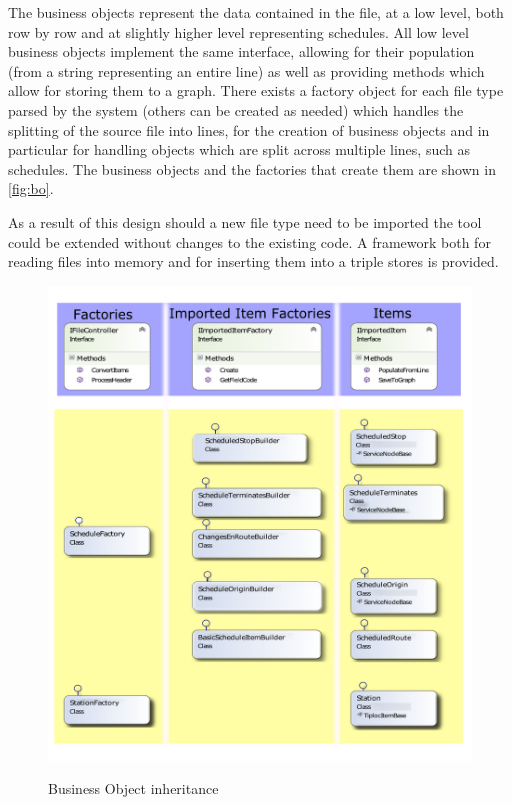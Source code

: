 The business objects represent the data contained in the file, at a low level, both row by row and at slightly higher level representing schedules. All low level business objects implement the same interface, allowing for their population (from a string representing an entire line) as well as providing methods which allow for storing them to a graph. There exists a factory object for each file type parsed by the system (others can be created as needed) which handles the splitting of the source file into lines, for the creation of business objects and in particular for handling objects which are split across multiple lines, such as schedules. The business objects and the factories that create them are shown in \autoref{fig:bo}.

As a result of this design should a new file type need to be imported the tool could be extended without changes to the existing code. A framework both for reading files into memory and for inserting them into a triple stores is provided.

\begin{figure}[!h]
\myfloatalign
{\includegraphics[width=\linewidth]{gfx/BussinessObjectsCat}} 
\caption{Business Object inheritance}
\label{fig:bo}
\end{figure}

